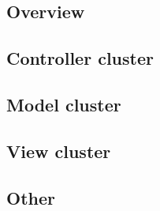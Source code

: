 \subsection{Overview}

\subsection{Controller cluster}

\subsection{Model cluster}

\subsection{View cluster}

\subsection{Other}

